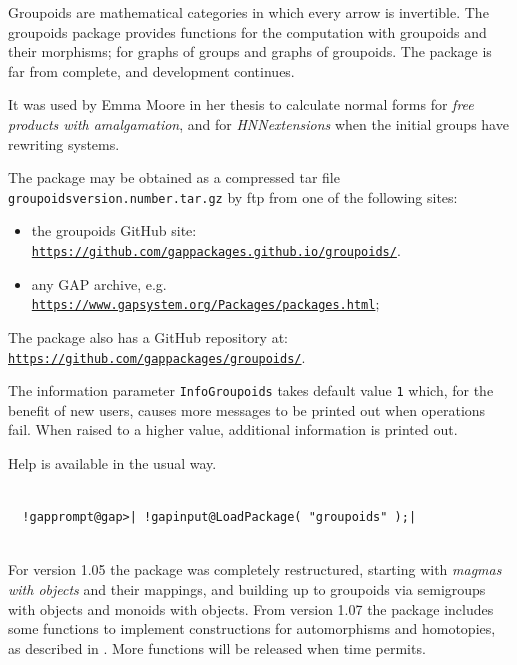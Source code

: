 \documentclass[a4paper,11pt]{report}
\begin{document}
{
  Groupoids are mathematical categories in which every arrow is invertible. The \textsf{groupoids} package provides functions for the computation with groupoids and their
morphisms; for graphs of groups and graphs of groupoids. The package is far
from complete, and development continues. 

 It was used by Emma Moore in her thesis \cite{emma-thesis} to calculate normal forms for \emph{free products with amalgamation}, and for \emph{HNN\texttt{}extensions} when the initial groups have rewriting systems. 

 The package may be obtained as a compressed tar file \texttt{groupoids\texttt{}version.number.tar.gz} by ftp from one of the following sites: 
\begin{itemize}
\item  the \textsf{groupoids} GitHub site: \href{https://github.com/gap-packages.github.io/groupoids/} {\texttt{https://github.com/gap\texttt{}packages.github.io/groupoids/}}. 
\item  any \textsf{GAP} archive, e.g. \href{https://www.gap-system.org/Packages/packages.html} {\texttt{https://www.gap\texttt{}system.org/Packages/packages.html}}; 
\end{itemize}
 The package also has a GitHub repository at: \href{https://github.com/gap-packages/groupoids/} {\texttt{https://github.com/gap\texttt{}packages/groupoids/}}. 

 The information parameter \texttt{InfoGroupoids} takes default value \texttt{1} which, for the benefit of new users, causes more messages to be printed out
when operations fail. When raised to a higher value, additional information is
printed out. 

 Help is available in the usual way. 

 
\begin{Verbatim}[commandchars=!@|,fontsize=\small,frame=single,label=Example]
  
  !gapprompt@gap>| !gapinput@LoadPackage( "groupoids" );|
  
\end{Verbatim}
 For version 1.05 the package was completely restructured, starting with \emph{magmas with objects} and their mappings, and building up to groupoids via semigroups with objects
and monoids with objects. From version 1.07 the package includes some
functions to implement constructions for automorphisms and homotopies, as
described in \cite{AlWe}. More functions will be released when time permits. 

}
\end{document}
